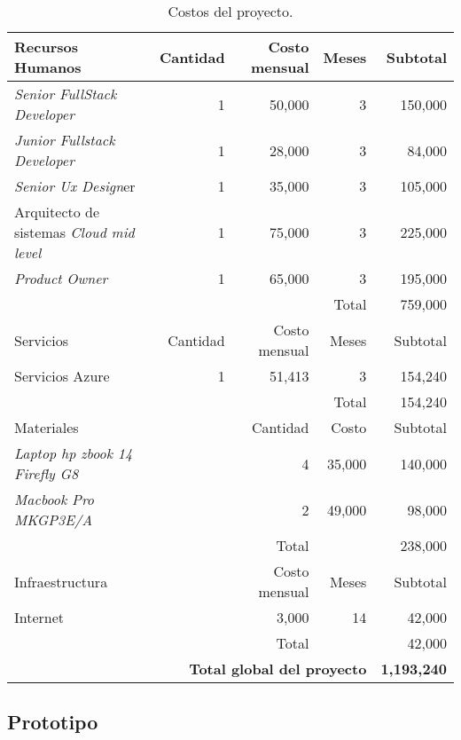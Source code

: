 \begin{table}
    \small\centering
    \caption{Costos del proyecto.}
    \label{tab:costos}
    \begin{tabular}{p{4.5cm}rrrr}
        \toprule
        Recursos Humanos & Cantidad & Costo mensual & Meses & Subtotal \\
        \midrule
        \textit{Senior FullStack Developer} & 1 & 50,000 & 3 & 150,000 \\
        \textit{Junior Fullstack Developer} & 1 & 28,000 & 3 & 84,000 \\
        \textit{Senior Ux Design}er & 1 & 35,000 & 3 & 105,000 \\
        Arquitecto de sistemas \textit{Cloud mid level} & 1 & 75,000 & 3 & 225,000 \\
        \textit{Product Owner }& 1 & 65,000 & 3 & 195,000 \\
        \midrule
        &  &  &  Total & 759,000 \\
        \bottomrule
        \toprule
        Servicios & Cantidad & Costo mensual & Meses & Subtotal \\
        \midrule
        Servicios Azure & 1 & 51,413 & 3 & 154,240 \\
        \midrule
        &  &  &  Total & 154,240 \\
        \bottomrule
        \toprule 
        Materiales & & Cantidad & Costo & Subtotal \\
        \midrule
        \textit{Laptop hp zbook 14 Firefly G8} & & 4 & 35,000 & 140,000 \\
        \textit{Macbook Pro MKGP3E/A} & & 2 & 49,000 & 98,000 \\
        \midrule
        &  &  Total &  & 238,000 \\
        \bottomrule 
        \toprule 
        Infraestructura &  & Costo mensual & Meses & Subtotal \\
        \midrule
        Internet & & 3,000 & 14 & 42,000 \\
        \midrule
        &  &  Total &  & 42,000 \\
        \bottomrule
        \toprule 
        \multicolumn{4}{r}{\textbf{Total global del proyecto}} & \textbf{1,193,240} \\
        \bottomrule
    \end{tabular}
\end{table}

\subsection{Prototipo}

